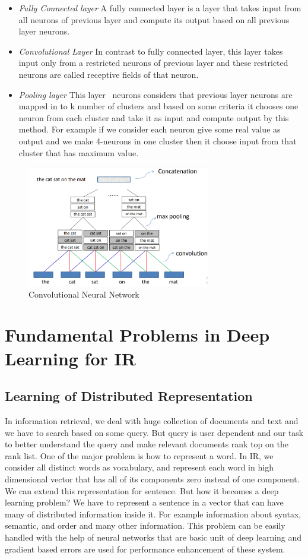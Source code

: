 \documentclass{doublecol-new}
\theoremstyle{TH}{
\newtheorem{lemma}{Lemma}
\newtheorem{theorem}[lemma]{Theorem}
\newtheorem{corrolary}[lemma]{Corrolary}
\newtheorem{conjecture}[lemma]{Conjecture}
\newtheorem{proposition}[lemma]{Proposition}
\newtheorem{claim}[lemma]{Claim}
\newtheorem{stheorem}[lemma]{Wrong Theorem}
\newtheorem{algorithm}{Algorithm}
}
\theoremstyle{THrm}{
\newtheorem{definition}{Definition}[section]
\newtheorem{question}{Question}[section]
\newtheorem{remark}{Remark}
\newtheorem{scheme}{Scheme}
}
\theoremstyle{THhit}{
\newtheorem{case}{Case}[section]
}
\begin{document}
\begin{itemize}
	\item {\em Fully Connected layer} A fully connected layer is a layer that takes input from all neurons of previous layer and compute its output based on all previous layer neurons.
	\item {\em Convolutional Layer} In contrast to fully connected layer, this layer takes input only from a restricted neurons of previous layer and these restricted neurons are called receptive fields of that neuron.
	\item {\em Pooling layer} This layer~\cite{shen2014latent} neurons considers that previous layer neurons are mapped in to k number of clusters and based on some criteria it chooses one neuron from each cluster and take it as input and compute output by this method. For example if we consider each neuron give some real value as output and we make 4-neurons in one cluster then it choose input from that cluster that has maximum value.  
	
	
\end{itemize}


\begin{figure}[h]
	\centerline{\includegraphics[width=8cm,keepaspectratio]{image/cnn.PNG}}
	\label{fig:Convolutional Neural Network}
	\caption{Convolutional Neural Network}
\end{figure} 

\section{Fundamental Problems in Deep Learning for IR}
\subsection{Learning of Distributed Representation}
In information retrieval, we deal with huge collection of documents and text and we have to search based on some query. But query is user dependent and our task to better understand the query and make relevant documents rank top on the rank list. One of the major problem is how to represent a word. In IR, we consider all distinct words as vocabulary, and represent each word in high dimensional vector that has all of its components zero instead of one component. We can extend this representation for sentence. But how it becomes a deep learning problem? We have to represent a sentence in a vector that can have many of distributed information inside it. For example information about syntax, semantic, and order and many other information. This problem can be easily handled with the help of neural networks that are basic unit of deep learning and gradient based errors are used for performance enhancement of these system.  
\end{document}
